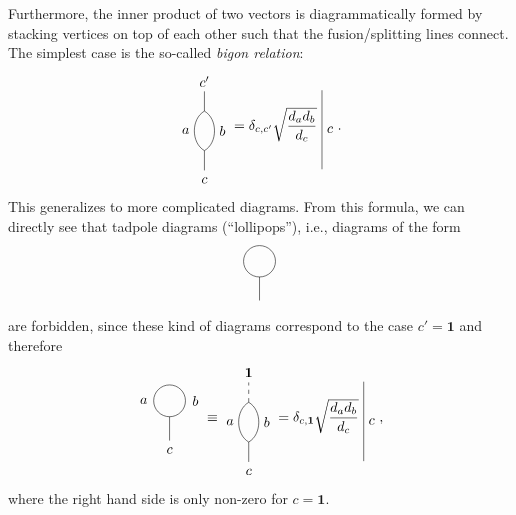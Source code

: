 Furthermore, the inner product of two vectors is diagrammatically formed by stacking vertices on top of each other such that the fusion/splitting lines connect. The simplest case is the so-called \emph{bigon relation}:
	\begin{equation}
	\label{eq:bigon2}
		\begin{tikzpicture}[baseline=(current bounding box.center)]
			\draw (0,0) -- (0,0.5);
			\draw (0,0.5) to[bend left=60] node[left] {$a$} (0,1.5);
			\draw (0,0.5) to[bend right=60] node[right] {$b$} (0,1.5);
			\draw (0,1.5) -- (0,2);
			\node at (0,-0.25) {$c$};
			\node at (0,2.25) {$c'$};
		\end{tikzpicture}=\delta_{c,c'}\sqrt{\frac{d_a d_b}{d_c}}\ 
		\begin{tikzpicture}[baseline=(current bounding box.center)]
			\draw (0,0) to node[right] {$c$} (0,2);
		\end{tikzpicture}.
	\end{equation}
This generalizes to more complicated diagrams. From this formula, we can directly see that tadpole diagrams (``lollipops''), i.e., diagrams of the form
	\begin{equation}
		\begin{tikzpicture}
			\draw (0,0) -- (0,0.6);
			\draw (0,1) circle (0.4cm);
		\end{tikzpicture}
	\end{equation}
are forbidden, since these kind of diagrams correspond to the case $c'=\mathbf{1}$ and therefore
	\begin{equation}
		\begin{tikzpicture}[baseline=(current bounding box.center)]
			\draw (0,0) -- (0,0.6);
			\draw (0,1) circle (0.4cm);
			\node at (0,-0.25) {$c$};
			\node at (-0.65,1) {$a$};
			\node at (0.65,1) {$b$};
		\end{tikzpicture}\equiv
		\begin{tikzpicture}[baseline=(current bounding box.center)]
			\draw (0,0) -- (0,0.5);
			\draw (0,0.5) to[bend left=60] node[left] {$a$} (0,1.5);
			\draw (0,0.5) to[bend right=60] node[right] {$b$} (0,1.5);
			\draw[dashed] (0,1.5) -- (0,2);
			\node at (0,-0.25) {$c$};
			\node at (0,2.25) {$\mathbf{1}$};
		\end{tikzpicture}=\delta_{c,\mathbf{1}}\sqrt{\frac{d_a d_b}{d_c}}\ 
		\begin{tikzpicture}[baseline=(current bounding box.center)]
			\draw (0,0) to node[right] {$c$} (0,2);
		\end{tikzpicture},
	\end{equation}
where the right hand side is only non-zero for $c=\mathbf{1}$.

